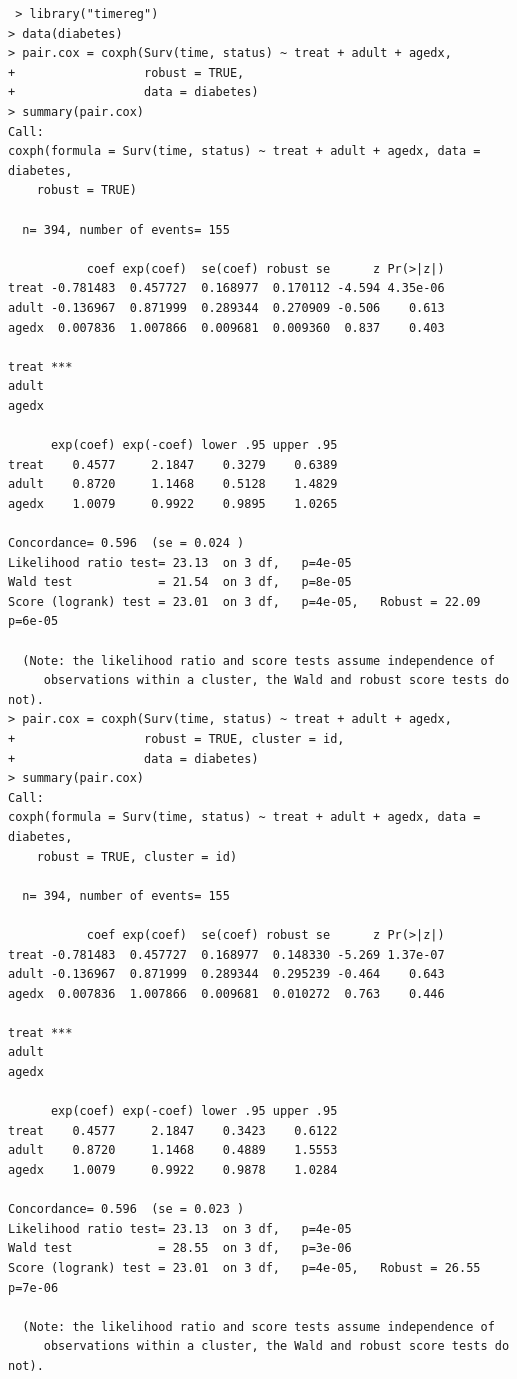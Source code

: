  \begin{lstlisting}
 > library("timereg")
> data(diabetes)
> pair.cox = coxph(Surv(time, status) ~ treat + adult + agedx,
+                  robust = TRUE, 
+                  data = diabetes)
> summary(pair.cox)
Call:
coxph(formula = Surv(time, status) ~ treat + adult + agedx, data = diabetes, 
    robust = TRUE)

  n= 394, number of events= 155 

           coef exp(coef)  se(coef) robust se      z Pr(>|z|)
treat -0.781483  0.457727  0.168977  0.170112 -4.594 4.35e-06
adult -0.136967  0.871999  0.289344  0.270909 -0.506    0.613
agedx  0.007836  1.007866  0.009681  0.009360  0.837    0.403
         
treat ***
adult    
agedx    

      exp(coef) exp(-coef) lower .95 upper .95
treat    0.4577     2.1847    0.3279    0.6389
adult    0.8720     1.1468    0.5128    1.4829
agedx    1.0079     0.9922    0.9895    1.0265

Concordance= 0.596  (se = 0.024 )
Likelihood ratio test= 23.13  on 3 df,   p=4e-05
Wald test            = 21.54  on 3 df,   p=8e-05
Score (logrank) test = 23.01  on 3 df,   p=4e-05,   Robust = 22.09  p=6e-05

  (Note: the likelihood ratio and score tests assume independence of
     observations within a cluster, the Wald and robust score tests do not).
> pair.cox = coxph(Surv(time, status) ~ treat + adult + agedx,
+                  robust = TRUE, cluster = id,
+                  data = diabetes)
> summary(pair.cox)
Call:
coxph(formula = Surv(time, status) ~ treat + adult + agedx, data = diabetes, 
    robust = TRUE, cluster = id)

  n= 394, number of events= 155 

           coef exp(coef)  se(coef) robust se      z Pr(>|z|)
treat -0.781483  0.457727  0.168977  0.148330 -5.269 1.37e-07
adult -0.136967  0.871999  0.289344  0.295239 -0.464    0.643
agedx  0.007836  1.007866  0.009681  0.010272  0.763    0.446
         
treat ***
adult    
agedx    

      exp(coef) exp(-coef) lower .95 upper .95
treat    0.4577     2.1847    0.3423    0.6122
adult    0.8720     1.1468    0.4889    1.5553
agedx    1.0079     0.9922    0.9878    1.0284

Concordance= 0.596  (se = 0.023 )
Likelihood ratio test= 23.13  on 3 df,   p=4e-05
Wald test            = 28.55  on 3 df,   p=3e-06
Score (logrank) test = 23.01  on 3 df,   p=4e-05,   Robust = 26.55  p=7e-06

  (Note: the likelihood ratio and score tests assume independence of
     observations within a cluster, the Wald and robust score tests do not).
 \end{lstlisting}    


